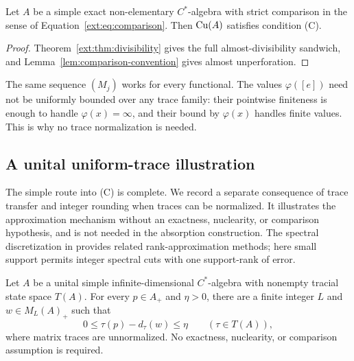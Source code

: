 \begin{corollary}
\label{ext:cor:condition-C}
Let $A$ be a simple exact non-elementary $C^*$-algebra with strict
comparison in the sense of Equation~\eqref{ext:eq:comparison}.
Then $\mathrm{Cu}(A)$ satisfies condition \textup{(C)}.
\end{corollary}

\begin{proof}
Theorem~\ref{ext:thm:divisibility} gives the full almost-divisibility
sandwich, and Lemma~\ref{lem:comparison-convention} gives almost
unperforation.
\end{proof}

\begin{remark}
The same sequence $(M_j)$ works for every functional. The values
$\varphi([e])$ need not be uniformly bounded over any trace family:
their pointwise finiteness is enough to handle $\varphi(x)=\infty$,
and their bound by $\varphi(x)$ handles finite values.
This is why no trace normalization is needed.
\end{remark}

\subsection{A unital uniform-trace illustration}

The simple route into (C) is complete. We record a separate consequence
of trace transfer and integer rounding when traces can be normalized.
It illustrates the approximation mechanism without an exactness,
nuclearity, or comparison hypothesis, and is not needed in the
absorption construction.
The spectral discretization in \cite[Section~5]{DadarlatToms2010} provides
related rank-approximation methods; here small support permits integer
spectral cuts with one support-rank of error.

\begin{proposition}
\label{prop:unital-approx}
Let $A$ be a unital simple infinite-dimensional $C^*$-algebra with
nonempty tracial state space $T(A)$. For every $p\in A_+$ and
$\eta>0$, there are a finite integer $L$ and $w\in M_L(A)_+$
such that
\[
 0\le\tau(p)-d_\tau(w)\le\eta
 \qquad(\tau\in T(A)),
\]
where matrix traces are unnormalized. No exactness, nuclearity, or
comparison assumption is required.
\end{proposition}

